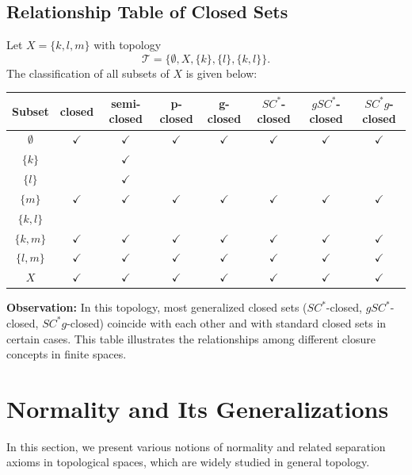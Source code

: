 \documentclass[12pt,a4paper,twoside]{report}  %
\theoremstyle{plain}
\theoremstyle{definition}
\begin{document}
\subsection{Relationship Table of Closed Sets}
Let $X = \{k, l, m\}$ with topology 
\[
\mathcal{T} = \{\emptyset, X, \{k\}, \{l\}, \{k, l\}\}.
\]
The classification of all subsets of $X$ is given below:

\begin{center}
\begin{tabular}{|c|c|c|c|c|c|c|c|}
\hline
Subset & closed & semi-closed & p-closed & g-closed & $SC^*$-closed & $gSC^*$-closed & $SC^*g$-closed \\
\hline
$\emptyset$ & $\checkmark$ & $\checkmark$ & $\checkmark$ & $\checkmark$ & $\checkmark$ & $\checkmark$ & $\checkmark$ \\
\hline
$\{k\}$ &  & $\checkmark$ &  &  &  &  &  \\
\hline
$\{l\}$ &  & $\checkmark$ &  &  &  &  &  \\
\hline
$\{m\}$ & $\checkmark$ & $\checkmark$ & $\checkmark$ & $\checkmark$ & $\checkmark$ & $\checkmark$ & $\checkmark$ \\
\hline
$\{k,l\}$ &  &  &  &  &  &  &  \\
\hline
$\{k,m\}$ & $\checkmark$ & $\checkmark$ & $\checkmark$ & $\checkmark$ & $\checkmark$ & $\checkmark$ & $\checkmark$ \\
\hline
$\{l,m\}$ & $\checkmark$ & $\checkmark$ & $\checkmark$ & $\checkmark$ & $\checkmark$ & $\checkmark$ & $\checkmark$ \\
\hline
$X$ & $\checkmark$ & $\checkmark$ & $\checkmark$ & $\checkmark$ & $\checkmark$ & $\checkmark$ & $\checkmark$ \\
\hline
\end{tabular}
\end{center}

\noindent\textbf{Observation:} In this topology, most generalized closed sets ($SC^*$-closed, $gSC^*$-closed, $SC^*g$-closed) coincide with each other and with standard closed sets in certain cases. This table illustrates the relationships among different closure concepts in finite spaces.

\section{Normality and Its Generalizations}

In this section, we present various notions of normality and related separation axioms in topological spaces, which are widely studied in general topology.
\end{document}
